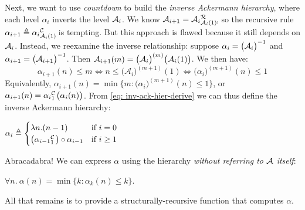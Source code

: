 Next, we want to use \emph{countdown} to build the \emph{inverse Ackermann hierarchy}, where each
level $\alpha_i$ inverts the level $\mathcal{A}_i$.
We know $\Ack_{i+1} = \rf{\Ack_i}{\Ack_i(1)}$\hspace{0.2em}, so the recursive
rule $\alpha_{i+1} \triangleq \cdt{\alpha_i}{\Ack_i(1)}$ is tempting.
But this approach is flawed because it still depends on $\mathcal{A}_i$.
Instead, we reexamine the inverse relationship: suppose $\alpha_i = \big(\mathcal{A}_i\big)^{-1}$ and $\alpha_{i+1} = \big(\mathcal{A}_{i+1}\big)^{-1}$. Then $\mathcal{A}_{i+1}(m) = \big(\mathcal{A}_{i}\big)^{(m)} \big(\mathcal{A}_{i}(1)\big)$. We then have:
\begin{equation} \label{eq: inv-ack-hier-derive}
\alpha_{i+1}(n)\le m \iff n\le \big(\mathcal{A}_i\big)^{(m+1)}(1) \iff \big(\alpha_i\big)^{(m+1)}(n) \le 1
\end{equation}
Equivalently, $\alpha_{i+1}(n) = \min\big\{m : \big( \alpha_i \big)^{(m+1)}(n)\le 1\big\}$, or $\alpha_{i+1}(n) = \cdt{\alpha_i}{1}\big(\alpha_i(n)\big)$. From \eqref{eq: inv-ack-hier-derive} we can thus define the inverse Ackermann hierarchy:
\begin{defn} \label{defn: inv-ack-hier}
	$ \alpha_i \triangleq \begin{cases}
	\lambda n.(n - 1) & \text{if } i = 0
	\\ \big(\cdt{\alpha_{i-1}}{1}\big)\circ \alpha_{i-1} & \text{if } i\ge 1 \end{cases}
$
\end{defn}
Abracadabra! We can express $\alpha$ using the hierarchy \emph{without referring to $\mathcal{A}$ itself}:
\begin{thm} \label{thm: inv-ack-new}
	$\forall n.~ \alpha(n) = \min\big\{k : \alpha_k(n)\le k \big\}$.
\end{thm}
\noindent All that remains is to provide a structurally-recursive function that computes $\alpha$.
